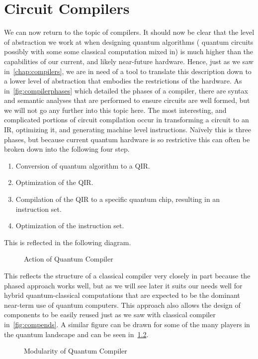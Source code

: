 \chapter{Circuit Compilers}\label{chap:circuit-compilers}

We can now return to the topic of compilers.
It should now be clear that the level of abstraction we work at when designing quantum algorithms (\ie{} quantum circuits possibly with some some classical computation mixed in) is much higher than the capabilities of our current, and likely near-future hardware.
Hence, just as we saw in~\cref{chap:compilers}, we are in need of a tool to translate this description down to a lower level of abstraction that embodies the restrictions of the hardware.
As in~\cref{fig:compilerphases} which detailed the phases of a compiler, there are syntax and semantic analyses that are performed to ensure circuits are well formed, but we will not go any further into this topic here.
The most interesting, and complicated portions of circuit compilation occur in transforming a circuit to an \ac{IR}, optimizing it, and generating machine level instructions.
Na\"{i}vely this is three phases, but because current quantum hardware is so restrictive this can often be broken down into the following four step.

\begin{enumerate}
    \item Conversion of quantum algorithm to a \ac{QIR}.
    \item Optimization of the \ac{QIR}.
    \item Compilation of the \ac{QIR} to a specific quantum chip, resulting in an instruction set.
    \item Optimization of the instruction set.
\end{enumerate}
This is reflected in the following diagram.
\begin{figure}[h] %
    \centering
    
    \caption{Action of Quantum Compiler}\label{fig:quantumcompiler}
\end{figure}

This reflects the structure of a classical compiler very closely in part because the phased approach works well, but as we will see later it suits our needs well for hybrid quantum-classical computations that are expected to be the dominant near-term use of quantum computers.
This approach also allows the design of components to be easily reused just as we saw with classical compiler in~\cref{fig:compends}.
A similar figure can be drawn for some of the many players in the quantum landscape and can be seen in~\cref{fig:optionsq}.
\begin{figure}[ht]
    \centering
    
    \caption{Modularity of Quantum Compiler}\label{fig:optionsq}
\end{figure}

